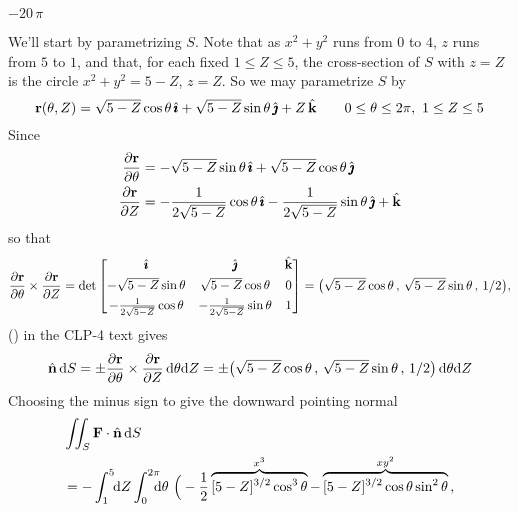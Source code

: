 
\begin{answer} 
$-20\,\pi$
\end{answer}

\begin{solution} 
We'll start by parametrizing $S$. Note that as $x^2+y^2$
runs from $0$ to $4$, $z$ runs from $5$ to $1$, and that, for each
fixed $1\le Z\le 5$, the cross-section of $S$ with $z=Z$
is the circle $x^2+y^2=5-Z$, $z=Z$. So we may parametrize $S$ by
\begin{equation*}
\mathbf{r}(\theta, Z) = \sqrt{5-Z}\cos\theta\,\hat{\pmb{\imath}}
                +\sqrt{5-Z}\sin\theta\,\hat{\pmb{\jmath}}
                +Z\,\hat{\mathbf{k}}\qquad
0\le\theta\le 2\pi,\ 1\le Z\le 5
\end{equation*}
Since
\begin{align*}
\frac{\partial\mathbf{r}}{\partial\theta}
&= -\sqrt{5-Z}\sin\theta\,\hat{\pmb{\imath}} +\sqrt{5-Z}\cos\theta\,\hat{\pmb{\jmath}}  \\
\frac{\partial\mathbf{r}}{\partial Z}
&= -\frac{1}{2\sqrt{5-Z}}\cos\theta\,\hat{\pmb{\imath}} -\frac{1}{2\sqrt{5-Z}}\sin\theta\,\hat{\pmb{\jmath}} 
  + \hat{\mathbf{k}}
\end{align*}
so that
\begin{equation*}
\frac{\partial\mathbf{r}}{\partial\theta}\times\frac{\partial\mathbf{r}}{\partial Z}
= \det\left[\begin{matrix} \hat{\pmb{\imath}} & \hat{\pmb{\jmath}} & \hat{\mathbf{k}} \\[0.05in]
-\sqrt{5-Z}\sin\theta & \sqrt{5-Z}\cos\theta & 0 \\[0.05in]
-\frac{1}{2\sqrt{5-Z}}\cos\theta &-\frac{1}{2\sqrt{5-Z}}\sin\theta & 1
         \end{matrix}\right]
= \big(\sqrt{5-Z}\cos\theta\,,\,\sqrt{5-Z}\sin\theta\,,\, 1/2\big),
\end{equation*}
() in the CLP-4 text gives
\begin{align*}
\hat{\mathbf{n}}\,\mathrm{d}S = \pm \frac{\partial\mathbf{r}}{\partial\theta}\times
            \frac{\partial\mathbf{r}}{\partial Z}\,\mathrm{d}\theta\mathrm{d}Z
= \pm \big(\sqrt{5-Z}\cos\theta\,,\,\sqrt{5-Z}\sin\theta\,,\, 1/2\big)
          \,\mathrm{d}\theta\mathrm{d}Z
\end{align*}
Choosing the minus sign to give the downward pointing normal
\begin{align*}
&\dblInt_S \vF\cdot\hn\,\dee{S}\\
&=-\int_1^5\hskip-3pt\dee{Z}\int_0^{2\pi}\hskip-6.5pt\dee{\theta}\ 
    \Big(-\frac{1}{2}\overbrace{[5-Z]^{3/2}\cos^3\theta}^{x^3} 
           - \overbrace{[5-Z]^{3/2}\cos\theta\sin^2\theta}^{xy^2} \,,\, 

\end{align*}
\end{solution}
